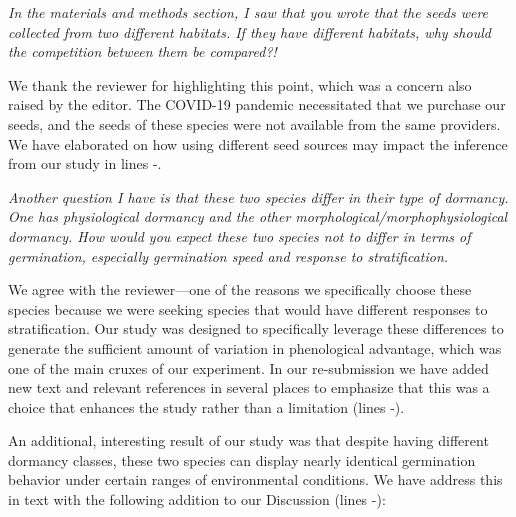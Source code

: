 \documentclass[11pt]{article}
\begin{document}
\emph{In the materials and methods section, I saw that you wrote that the seeds were collected from two different habitats. If they have different habitats, why should the competition between them be compared?!}

We thank the reviewer for highlighting this point, which was a concern also raised by the editor. The COVID-19 pandemic necessitated that we purchase our seeds, and the seeds of these species were not available from the same providers. We have elaborated on how using different seed sources may impact the inference from our study in lines -.

\emph{Another question I have is that these two species differ in their type of dormancy. One has physiological dormancy and the other morphological/morphophysiological dormancy. How would you expect these two species not to differ in terms of germination, especially germination speed and response to stratification.}

We agree with the reviewer---one of the reasons we specifically choose these species because we were seeking species that would have different responses to stratification. 
Our study was designed to specifically leverage these differences to generate the sufficient amount of variation in phenological advantage, which was one of the main cruxes of our experiment. In our re-submission we have added new text and relevant references in several places to emphasize that this was a choice that enhances the study rather than a limitation (lines -).

An additional, interesting result of our study was that despite having different dormancy classes, these two species can display nearly identical germination behavior under certain ranges of environmental conditions. We have address this in text with the following addition to our Discussion (lines -):

\end{document}
